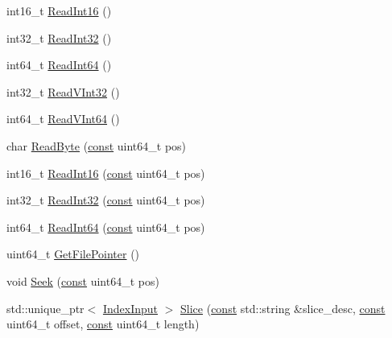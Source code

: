 \begin{DoxyCompactItemize}
\item 
int16\+\_\+t \mbox{\hyperlink{classlucene_1_1core_1_1store_1_1BufferedIndexInput_ae3c6ec72361c91307e01899da55df4b2}{Read\+Int16}} ()
\item 
int32\+\_\+t \mbox{\hyperlink{classlucene_1_1core_1_1store_1_1BufferedIndexInput_a9e4dfe35550c492c8cbcb412a39f08e7}{Read\+Int32}} ()
\item 
int64\+\_\+t \mbox{\hyperlink{classlucene_1_1core_1_1store_1_1BufferedIndexInput_a1df116d1285059a70aff7cb2ede46906}{Read\+Int64}} ()
\item 
int32\+\_\+t \mbox{\hyperlink{classlucene_1_1core_1_1store_1_1BufferedIndexInput_ad1ab15db89ccb21f3b777874dfe8534b}{Read\+V\+Int32}} ()
\item 
int64\+\_\+t \mbox{\hyperlink{classlucene_1_1core_1_1store_1_1BufferedIndexInput_a34e0b8db80c8efdc4bd34f6326be9c64}{Read\+V\+Int64}} ()
\item 
char \mbox{\hyperlink{classlucene_1_1core_1_1store_1_1BufferedIndexInput_aaa00e69ec70757bc2534803761ac8859}{Read\+Byte}} (\mbox{\hyperlink{ZlibCrc32_8h_a2c212835823e3c54a8ab6d95c652660e}{const}} uint64\+\_\+t pos)
\item 
int16\+\_\+t \mbox{\hyperlink{classlucene_1_1core_1_1store_1_1BufferedIndexInput_a76ab5a2911c939f267245b35e69e779e}{Read\+Int16}} (\mbox{\hyperlink{ZlibCrc32_8h_a2c212835823e3c54a8ab6d95c652660e}{const}} uint64\+\_\+t pos)
\item 
int32\+\_\+t \mbox{\hyperlink{classlucene_1_1core_1_1store_1_1BufferedIndexInput_a4c42570e52badebd5d2bd847611c6a31}{Read\+Int32}} (\mbox{\hyperlink{ZlibCrc32_8h_a2c212835823e3c54a8ab6d95c652660e}{const}} uint64\+\_\+t pos)
\item 
int64\+\_\+t \mbox{\hyperlink{classlucene_1_1core_1_1store_1_1BufferedIndexInput_a500b3dc2413232d351407e84678724c6}{Read\+Int64}} (\mbox{\hyperlink{ZlibCrc32_8h_a2c212835823e3c54a8ab6d95c652660e}{const}} uint64\+\_\+t pos)
\item 
uint64\+\_\+t \mbox{\hyperlink{classlucene_1_1core_1_1store_1_1BufferedIndexInput_a5a47bbae63d295cd569638aeb678399b}{Get\+File\+Pointer}} ()
\item 
void \mbox{\hyperlink{classlucene_1_1core_1_1store_1_1BufferedIndexInput_a251eb285e9e7b132c543d0d3920007ff}{Seek}} (\mbox{\hyperlink{ZlibCrc32_8h_a2c212835823e3c54a8ab6d95c652660e}{const}} uint64\+\_\+t pos)
\item 
std\+::unique\+\_\+ptr$<$ \mbox{\hyperlink{classlucene_1_1core_1_1store_1_1IndexInput}{Index\+Input}} $>$ \mbox{\hyperlink{classlucene_1_1core_1_1store_1_1BufferedIndexInput_a0fd5c90945647f8f9b306c1a318a83fc}{Slice}} (\mbox{\hyperlink{ZlibCrc32_8h_a2c212835823e3c54a8ab6d95c652660e}{const}} std\+::string \&slice\+\_\+desc, \mbox{\hyperlink{ZlibCrc32_8h_a2c212835823e3c54a8ab6d95c652660e}{const}} uint64\+\_\+t offset, \mbox{\hyperlink{ZlibCrc32_8h_a2c212835823e3c54a8ab6d95c652660e}{const}} uint64\+\_\+t length)

\end{DoxyCompactItemize}
